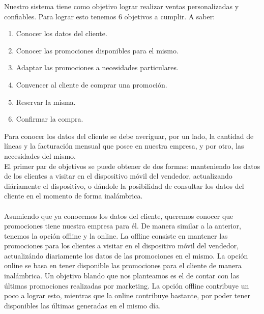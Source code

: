 Nuestro sistema tiene como objetivo lograr realizar ventas personalizadas y confiables. Para lograr esto tenemos 6 objetivos a cumplir. A saber:
\begin{enumerate}
	\item Conocer los datos del cliente.
	\item Conocer las promociones disponibles para el mismo.
	\item Adaptar las promociones a necesidades particulares.
	\item Convencer al cliente de comprar una promoción.
	\item Reservar la misma.
	\item Confirmar la compra.
\end{enumerate}
\indent Para conocer los datos del cliente se debe averiguar, por un lado, la cantidad de líneas y la facturación mensual que posee en nuestra empresa, y por otro, las necesidades del mismo.\\
\indent El primer par de objetivos se puede obtener de dos formas: manteniendo los datos de los clientes a visitar en el dispositivo móvil del vendedor, actualizando diáriamente el dispositivo, o dándole la posibilidad de consultar los datos del cliente en el momento de forma inalámbrica.\\
\\
\indent Asumiendo que ya conocemos los datos del cliente, queremos conocer que promociones tiene nuestra empresa para él. De manera similar a la anterior, tenemos la opción offline y la online. La offline consiste en mantener las promociones para los clientes a visitar en el dispositivo móvil del vendedor, actualizándo diariamente los datos de las promociones en el mismo. La opción online se basa en tener disponible las promociones para el cliente de manera inalámbrica. Un objetivo blando que nos planteamos es el de contar con las últimas promociones realizadas por marketing. La opción offline contribuye un poco a lograr esto, mientras que la online contribuye bastante, por poder tener disponibles las últimas generadas en el mismo día.\\
\\


